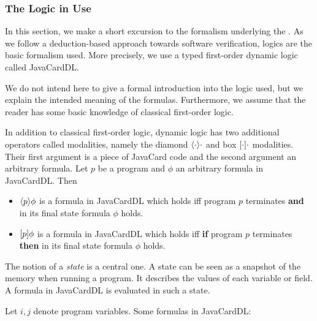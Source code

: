 \subsubsection{The Logic in Use}
\label{sec:logc}

In this section, we make a short excursion to the formalism underlying
the \kt. As we follow a deduction-based approach towards software
verification, logics are the basic formalism used. More precisely,
we use a
typed first-order dynamic logic called JavaCardDL. 

We do not intend here to give a formal introduction into the
logic used, but we explain the intended meaning of the formulas. Furthermore, we
assume that the reader has some basic knowledge of classical
first-order logic. 

In addition to classical first-order logic, dynamic logic has two
additional operators called modalities, namely the diamond
$\langle\cdot\rangle{\cdot}$ and box $[\cdot]{\cdot}$ modalities. Their
first argument is a piece of JavaCard code and the second argument
an arbitrary formula. Let $p$ be a program and $\phi$ an arbitrary
formula in JavaCardDL. Then 
\begin{itemize}
  \item $\langle p\rangle{\phi}$ is a formula in JavaCardDL which holds iff
    program $p$ terminates \textbf{and} in its final state formula $\phi$
    holds.  
  \item $[p]{\phi}$ is a formula in JavaCardDL which holds iff
    \textbf{if} program $p$ terminates \textbf{then} in its final
    state formula $\phi$ holds.
\end{itemize}

The notion of a \emph{state} is a central one. A state can be
seen as a snapshot of the memory when running a program. It
describes the values of each variable or field. A formula in
JavaCardDL is evaluated in such a state. 

Let $i,j$ denote program variables. Some formulas in JavaCardDL:

